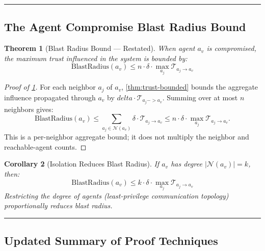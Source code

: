 \documentclass[
]{article}
\newtheorem{theorem}{Theorem}[section]
\newtheorem{corollary}[theorem]{Corollary}
\begin{document}
\begin{center}\rule{0.5\linewidth}{0.5pt}\end{center}

\subsection{The Agent Compromise Blast Radius
Bound}\label{sec:thm-blast-radius}

\begin{theorem}[Blast Radius Bound --- Restated]
\label{thm:blast-radius-restated}
When agent $a_v$ is compromised, the maximum trust influenced in the system is bounded by:
\begin{equation}
\label{eq:blast-restated}
\text{BlastRadius}(a_v) \leq n \cdot \delta \cdot \max_{a_j} \mathcal{T}_{a_j \to a_v}
\end{equation}
\end{theorem}

\begin{proof}[Proof of \cref{thm:blast-radius-restated}]
For each neighbor $a_j$ of $a_v$, \cref{thm:trust-bounded} bounds the aggregate influence propagated through $a_v$ by $delta \cdot \mathcal{T}_{a_j -> a_v}$. Summing over at most $n$ neighbors gives:
\begin{equation}
\label{eq:blast-step-2}
\text{BlastRadius}(a_v) \leq \sum_{a_j \in \mathcal{N}(a_v)} \delta \cdot \mathcal{T}_{a_j \to a_v} \leq n \cdot \delta \cdot \max_{a_j} \mathcal{T}_{a_j \to a_v}.
\end{equation}
This is a per-neighbor aggregate bound; it does not multiply the neighbor and reachable-agent counts.
\end{proof}

\begin{corollary}[Isolation Reduces Blast Radius]
\label{cor:isolation-blast}
If $a_v$ has degree $|\mathcal{N}(a_v)| = k$, then:
\begin{equation}
\label{eq:isolation-blast}
\text{BlastRadius}(a_v) \leq k \cdot \delta \cdot \max_{a_j} \mathcal{T}_{a_j \to a_v}
\end{equation}
Restricting the degree of agents (least-privilege communication topology) proportionally reduces blast radius.
\end{corollary}

\begin{center}\rule{0.5\linewidth}{0.5pt}\end{center}

\subsection{Updated Summary of Proof
Techniques}\label{sec:proof-summary-v2}
\end{document}

